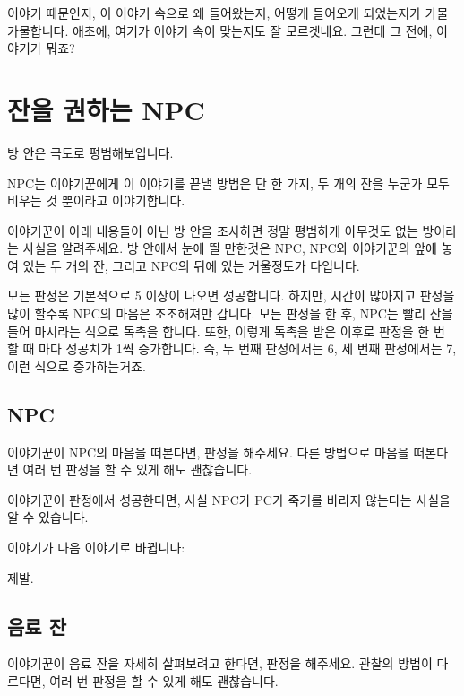 \documentclass{report}
\begin{document}
	 이야기 때문인지, 이 이야기 속으로 왜 들어왔는지, 어떻게 들어오게 되었는지가 가물가물합니다. 애초에, 여기가 이야기 속이 맞는지도 잘 모르겟네요. 그런데 그 전에, 이야기가 뭐죠?
	
	\section{잔을 권하는 NPC}
	
	방 안은 극도로 평범해보입니다.
	
	NPC는 이야기꾼에게 이 이야기를 끝낼 방법은 단 한 가지, 두 개의 잔을 누군가 모두 비우는 것 뿐이라고 이야기합니다.
	
	이야기꾼이 아래 내용들이 아닌 방 안을 조사하면 정말 평범하게 아무것도 없는 방이라는 사실을 알려주세요. 방 안에서 눈에 띌 만한것은 NPC, NPC와 이야기꾼의 앞에 놓여 있는 두 개의 잔, 그리고 NPC의 뒤에 있는 거울정도가 다입니다.
	
	모든 판정은 기본적으로 5 이상이 나오면 성공합니다. 하지만, 시간이 많아지고 판정을 많이 할수록 NPC의 마음은 초조해져만 갑니다. 모든 판정을 한 후, NPC는 빨리 잔을 들어 마시라는 식으로 독촉을 합니다. 또한, 이렇게 독촉을 받은 이후로 판정을 한 번 할 때 마다 성공치가 1씩 증가합니다. 즉, 두 번째 판정에서는 6, 세 번째 판정에서는 7, 이런 식으로 증가하는거죠.
	
	\subsection{NPC}
	
	이야기꾼이 NPC의 마음을 떠본다면, 판정을 해주세요. 다른 방법으로 마음을 떠본다면 여러 번 판정을 할 수 있게 해도 괜찮습니다.
	
	이야기꾼이 판정에서 성공한다면, 사실 NPC가 PC가 죽기를 바라지 않는다는 사실을 알 수 있습니다.
	
	 이야기가 다음 이야기로 바뀝니다:
	
	\begin{lite}{제발.}
	\end{lite}
	
	\subsection{음료 잔}
	
	이야기꾼이 음료 잔을 자세히 살펴보려고 한다면, 판정을 해주세요. 관찰의 방법이 다르다면, 여러 번 판정을 할 수 있게 해도 괜찮습니다.
	
\end{document}
